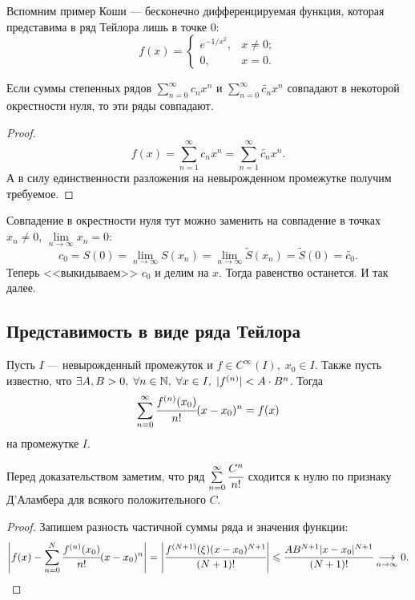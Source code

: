 \documentclass[a4paper, 12pt]{article}
\begin{document}
Вспомним пример Коши --- бесконечно дифференцируемая функция, которая представима в ряд Тейлора лишь в точке 0:
\[
    f(x) = 
    \begin{cases}
        e^{-1/x^2}, & x \neq 0;\\
        0, & x = 0.
    \end{cases}
\]
\begin{Consequence}
    Если суммы степенных рядов $\sum\limits_{n=0}^{\infty}c_n x^n$ и $\sum\limits_{n=0}^{\infty}\widetilde{c_n} x^n$ совпадают в некоторой окрестности нуля, то эти ряды совпадают.
\end{Consequence}
\begin{proof}
    \[
        f(x) = \sum\limits_{n=1}^{\infty} c_n x^n = \sum\limits_{n=1}^{\infty} \widetilde{c_n} x^n.
    \]
    А в силу единственности разложения на невырожденном промежутке получим требуемое.
\end{proof}
\begin{Comment}
    Совпадение в окрестности нуля тут можно заменить на совпадение в точках $x_n \neq 0$, $\lim\limits_{n\to \infty} x_n = 0$:
    \[
        c_0 = S(0) = \lim\limits_{n \to \infty} S(x_n) = \lim\limits_{n \to \infty} \widetilde{S}(x_n) = \widetilde{S}(0) = \widetilde{c_0}.
    \]
    Теперь <<выкидываем>> $c_0$ и делим на $x$. Тогда равенство останется. И так далее.
\end{Comment}

\subsection{Представимость в виде ряда Тейлора}

\begin{Theorem}
    Пусть $I$ --- невырожденный промежуток и $f \in C^{\infty}(I),\; x_0 \in I$. Также пусть известно, что $\exists A, B>0,\; \forall n\in \mathbb{N},\; \forall x\in I,\; |f^{(n)}| < A\cdot B^n$. Тогда 
    \[
        \sum\limits_{n = 0}^{\infty} \cfrac{f^{(n)}(x_0)}{n!}(x-x_0)^n = f(x)
    \]
    на промежутке $I$.
\end{Theorem}
Перед доказательством заметим, что ряд $\sum\limits_{n=0}^{\infty}\cfrac{C^n}{n!}$ сходится к нулю по признаку Д'Аламбера для всякого положительного $C$. 
\begin{proof}
    Запишем разность частичной суммы ряда и значения функции:
    \begin{gather*}
        \left| f(x) - \sum\limits_{n=0}^{N} \cfrac{f^{(n)}(x_0)}{n!} (x-x_0)^n\right| = 
        \left| \cfrac{f^{(N+1)}(\xi) (x-x_0)^{N+1}}{(N+1)!} \right| \leqslant \cfrac{AB^{N+1}|x-x_0|^{N+1}}{(N+1)!} \underset{n \to \infty}{\longrightarrow} 0.
    \end{gather*}
\end{proof}
\end{document}
